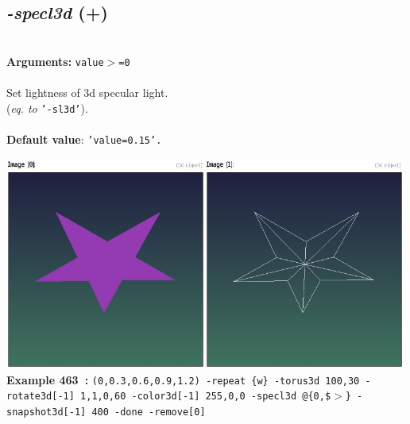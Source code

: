 \documentclass[a4paper,11pt,twoside]{book}
\begin{document}
\subsection{\emph{-specl3d} (+)}\vspace*{-0.5em}
~\\\textbf{Arguments: } 
{\small \texttt{value$>$=0}}\\~\\
Set lightness of 3d specular light.
~\\(\emph{eq. to} {\small \texttt{'-sl3d'}}).
~\\~\\\textbf{Default value}: {\small \texttt{'value=0.15'.}}
\begin{center}\includegraphics[keepaspectratio=true,height=7cm,width=\textwidth]{img/gmic_def463.jpg}\\
{\footnotesize \textbf{Example 463~:} \texttt{(0,0.3,0.6,0.9,1.2) -repeat \{w\} -torus3d 100,30 -rotate3d[-1] 1,1,0,60 -color3d[-1] 255,0,0 -specl3d @\{0,\$$>$\} -snapshot3d[-1] 400 -done -remove[0]}}
\end{center}
\end{document}
